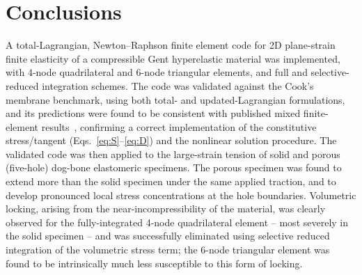 \documentclass[11pt,a4paper]{article}
\begin{document}
\section{Conclusions}
A total-Lagrangian, Newton--Raphson finite element code for 2D plane-strain finite elasticity of a
compressible Gent hyperelastic material was implemented, with 4-node quadrilateral and 6-node triangular
elements, and full and selective-reduced integration schemes. The code was validated against the Cook's
membrane benchmark, using both total- and updated-Lagrangian formulations, and its predictions were found
to be consistent with published mixed finite-element results~\cite{brinkstein1996}, confirming a correct
implementation of the constitutive stress/tangent (Eqs.~\eqref{eq:S}--\eqref{eq:D}) and the nonlinear
solution procedure. The validated code was then applied to the large-strain tension of solid and porous
(five-hole) dog-bone elastomeric specimens. The porous specimen was found to extend more than the solid
specimen under the same applied traction, and to develop pronounced local stress concentrations at the
hole boundaries. Volumetric locking, arising from the near-incompressibility of the material, was clearly
observed for the fully-integrated 4-node quadrilateral element -- most severely in the solid specimen --
and was successfully eliminated using selective reduced integration of the volumetric stress term; the
6-node triangular element was found to be intrinsically much less susceptible to this form of locking.

\appendix
\end{document}
